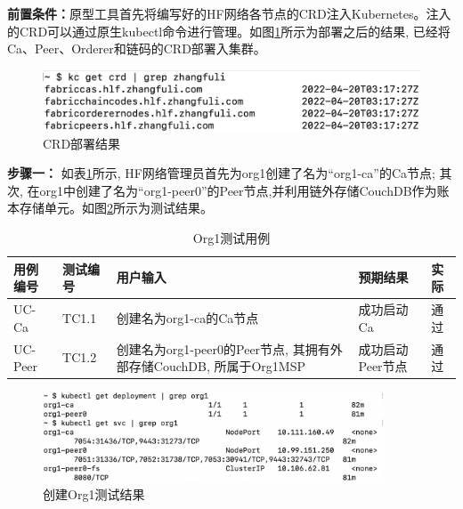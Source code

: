 \textbf{前置条件：}原型工具首先将编写好的HF网络各节点的CRD注入Kubernetes。注入的CRD可以通过原生kubectl命令进行管理。如图\ref{crdresult}所示为部署之后的结果, 已经将Ca、Peer、Orderer和链码的CRD部署入集群。

\begin{figure}[h] %
    \centering %
    \includegraphics[width=1.0\textwidth]{FIGs/chapter6/crds.png} %
    \caption{CRD部署结果} %
    \label{crdresult} %
\end{figure}%

\textbf{步骤一：} 如表\ref{org1_test}所示, HF网络管理员首先为org1创建了名为“org1-ca”的Ca节点; 其次, 在org1中创建了名为“org1-peer0”的Peer节点,并利用链外存储CouchDB作为账本存储单元。如图\ref{testcase1result}所示为测试结果。

{\footnotesize
\begin{longtable}[h]{m{45pt} m{45pt} m{180pt} m{50pt} m{20pt}}
    \caption[创建Org1测试用例]{Org1测试用例} \label{org1_test}\\
        \toprule  
        \textbf{用例编号}&\textbf{测试编号}&\textbf{用户输入}&\textbf{预期结果}&\textbf{实际}\\
        \hline
        UC-Ca & TC1.1 & 创建名为org1-ca的Ca节点 & 成功启动Ca & 通过 \\
        \hline
        UC-Peer & TC1.2 & 创建名为org1-peer0的Peer节点, 其拥有外部存储CouchDB, 所属于Org1MSP & 成功启动Peer节点 & 通过 \\
        \bottomrule
    \end{longtable} 
}

\begin{figure}[h] %
    \centering %
    \includegraphics[width=0.9\textwidth]{FIGs/chapter6/peer.png} %
    \caption{创建Org1测试结果} %
    \label{testcase1result} %
\end{figure}%

